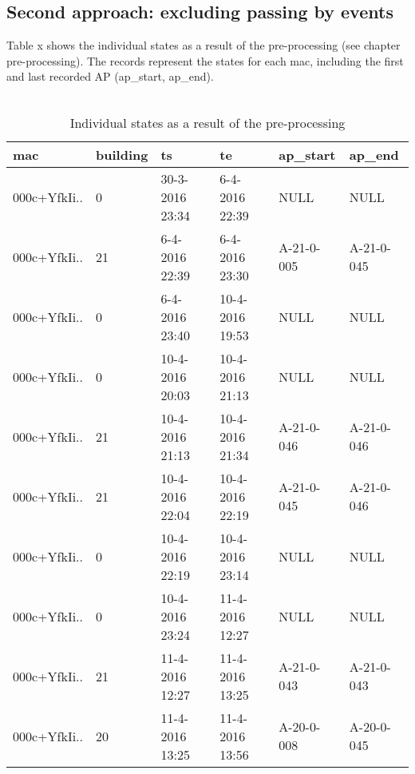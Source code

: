 \subsection{Second approach: excluding passing by events}
Table x shows the individual states as a result of the pre-processing (see chapter pre-processing). The records represent the states for each mac, including the first and last recorded AP (ap\_start, ap\_end). \\\\
\begin{table}[H]
	\centering
	\captionsetup{justification=centering}
	\caption{Individual states as a result of the pre-processing}
	\label{individualstates}
	\begin{tabular}{@{}llllll@{}}
		\toprule
		\textbf{mac} & \textbf{building} & \textbf{ts}     & \textbf{te}     & \textbf{ap\_start} & \textbf{ap\_end} \\ \midrule
		000c+YfkIi.. & 0                 & 30-3-2016 23:34 & 6-4-2016 22:39  & NULL               & NULL             \\
		000c+YfkIi.. & 21                & 6-4-2016 22:39  & 6-4-2016 23:30  & A-21-0-005         & A-21-0-045       \\
		000c+YfkIi.. & 0                 & 6-4-2016 23:40  & 10-4-2016 19:53 & NULL               & NULL             \\
		000c+YfkIi.. & 0                 & 10-4-2016 20:03 & 10-4-2016 21:13 & NULL               & NULL             \\
		000c+YfkIi.. & 21                & 10-4-2016 21:13 & 10-4-2016 21:34 & A-21-0-046         & A-21-0-046       \\
		000c+YfkIi.. & 21                & 10-4-2016 22:04 & 10-4-2016 22:19 & A-21-0-045         & A-21-0-046       \\
		000c+YfkIi.. & 0                 & 10-4-2016 22:19 & 10-4-2016 23:14 & NULL               & NULL             \\
		000c+YfkIi.. & 0                 & 10-4-2016 23:24 & 11-4-2016 12:27 & NULL               & NULL             \\
		000c+YfkIi.. & 21                & 11-4-2016 12:27 & 11-4-2016 13:25 & A-21-0-043         & A-21-0-043       \\
		000c+YfkIi.. & 20                & 11-4-2016 13:25 & 11-4-2016 13:56 & A-20-0-008         & A-20-0-045       \\ \bottomrule
	\end{tabular}
\end{table}
